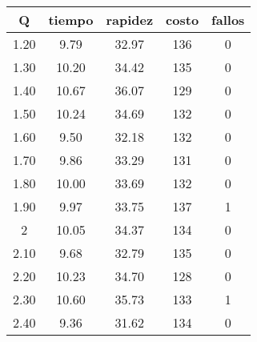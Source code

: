 \begin{table}[h!]
\centering
\begin{tabular}{ccccc}
Q & tiempo & rapidez & costo & fallos \\ 
\hline 
1.20 & 9.79 & 32.97 & 136 & 0 \\ 
1.30 & 10.20 & 34.42 & 135 & 0 \\ 
1.40 & 10.67 & 36.07 & 129 & 0 \\ 
1.50 & 10.24 & 34.69 & 132 & 0 \\ 
1.60 & 9.50 & 32.18 & 132 & 0 \\ 
1.70 & 9.86 & 33.29 & 131 & 0 \\ 
1.80 & 10.00 & 33.69 & 132 & 0 \\ 
1.90 & 9.97 & 33.75 & 137 & 1 \\ 
2 & 10.05 & 34.37 & 134 & 0 \\ 
2.10 & 9.68 & 32.79 & 135 & 0 \\ 
2.20 & 10.23 & 34.70 & 128 & 0 \\ 
2.30 & 10.60 & 35.73 & 133 & 1 \\ 
2.40 & 9.36 & 31.62 & 134 & 0 \\ 
\hline 
\end{tabular}
\end{table}